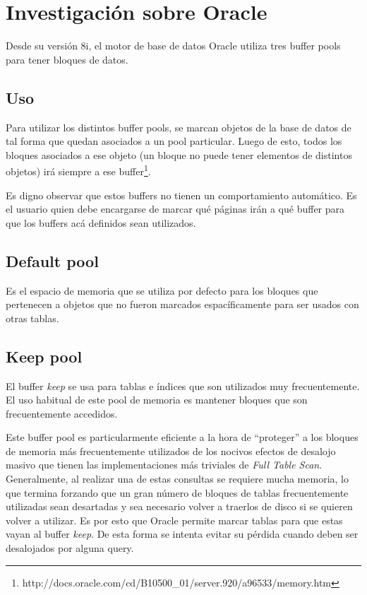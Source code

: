 \section{Investigación sobre Oracle}

Desde su versión 8i, el motor de base de datos Oracle utiliza tres buffer pools para tener bloques de datos.

\subsection{Uso}
Para utilizar los distintos buffer pools, se marcan objetos de la base de datos de tal forma que quedan asociados a un pool particular. Luego de esto, todos los bloques asociados a ese objeto (un bloque no puede tener elementos de distintos objetos) irá siempre a ese buffer\footnote{http://docs.oracle.com/cd/B10500\_01/server.920/a96533/memory.htm}. 

Es digno observar que estos buffers no tienen un comportamiento automático. Es el usuario quien debe encargarse de marcar qué páginas irán a qué buffer para que los buffers acá definidos sean utilizados. 

\subsection{Default pool}
Es el espacio de memoria que se utiliza por defecto para los bloques que pertenecen a objetos que no fueron marcados espacíficamente para ser usados con otras tablas.

\subsection{Keep pool}
El buffer \textit{keep} se usa para tablas e índices que son utilizados muy frecuentemente. El uso habitual de este pool de memoria es mantener bloques que son frecuentemente accedidos. 

Este buffer pool es particularmente eficiente a la hora de ``proteger'' a los bloques de memoria más frecuentemente utilizados de los nocivos efectos de desalojo masivo que tienen las implementaciones más triviales de \textit{Full Table Scan}. Generalmente, al realizar una de estas consultas se requiere mucha memoria, lo que termina forzando que un gran número de bloques de tablas frecuentemente utilizadas sean desartadas y sea necesario volver a traerlos de disco si se quieren volver a utilizar. Es por esto que Oracle permite marcar tablas para que estas vayan al buffer \textit{keep}. De esta forma se intenta evitar su pérdida cuando deben ser desalojados por alguna query.

